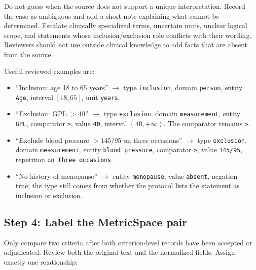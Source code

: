 \documentclass[11pt]{article}
\begin{document}
Do not guess when the source does not support a unique interpretation. Record the case as ambiguous and add a short note explaining what cannot be determined. Escalate clinically specialized terms, uncertain units, unclear logical scope, and statements whose inclusion/exclusion role conflicts with their wording. Reviewers should not use outside clinical knowledge to add facts that are absent from the source.

Useful reviewed examples are:

\begin{itemize}
    \item ``Inclusion: age 18 to 65 years'' $\rightarrow$ type \texttt{inclusion}, domain \texttt{person}, entity \texttt{Age}, interval $[18,65]$, unit \texttt{years}.
    \item ``Exclusion: GPL $>40$'' $\rightarrow$ type \texttt{exclusion}, domain \texttt{measurement}, entity \texttt{GPL}, comparator \texttt{>}, value \texttt{40}, interval $(40,+\infty)$. The comparator remains \texttt{>}.
    \item ``Exclude blood pressure $>145/95$ on three occasions'' $\rightarrow$ type \texttt{exclusion}, domain \texttt{measurement}, entity \texttt{blood pressure}, comparator \texttt{>}, value \texttt{145/95}, repetition \texttt{on three occasions}.
    \item ``No history of menopause'' $\rightarrow$ entity \texttt{menopause}, value \texttt{absent}, negation true; the type still comes from whether the protocol lists the statement as inclusion or exclusion.
\end{itemize}

\subsection{Step 4: Label the MetricSpace pair}

Only compare two criteria after both criterion-level records have been accepted or adjudicated. Review both the original text and the normalized fields. Assign exactly one relationship:
\end{document}
